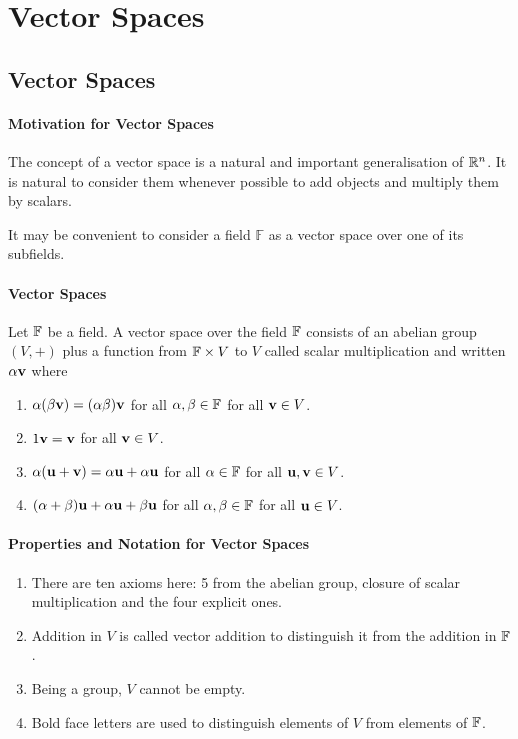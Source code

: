 \section{Vector Spaces}
\subsection{Vector Spaces}

\paragraph{Motivation for Vector Spaces}
The concept of a vector space is a natural and important generalisation of \(\mathbb{R}^n\). It is natural to consider them whenever possible to add objects and multiply them by scalars.

It may be convenient to consider a field \(\mathbb{F}\) as a vector
space over one of its subfields.

\paragraph{Vector Spaces}
Let \(\mathbb{F}\) be a field. A vector space over the field \(\mathbb{F}\) consists of an abelian group \((V, +)\) plus a function from \(\mathbb{F} \times V\) to \(V\) called scalar multiplication and written \(\alpha\mathbf{v}\) where
\begin{enumerate}
    \item \(\alpha(\beta\mathbf{v}) = (\alpha\beta)\mathbf{v}\) for all \(\alpha, \beta \in \mathbb{F}\) for all \(\mathbf{v} \in V\).
    \item \(1\mathbf{v} = \mathbf{v}\) for all \(\mathbf{v} \in V\).
    \item \(\alpha(\mathbf{u} + \mathbf{v}) = \alpha\mathbf{u} + \alpha\mathbf{u}\) for all \(\alpha \in \mathbb{F}\) for all \(\mathbf{u}, \mathbf{v} \in V\).
    \item \((\alpha + \beta)\mathbf{u} + \alpha\mathbf{u} + \beta\mathbf{u}\) for all \(\alpha, \beta \in \mathbb{F}\) for all \(\mathbf{u} \in V\).
\end{enumerate}

\paragraph{Properties and Notation for Vector Spaces}
\begin{enumerate}
    \item There are ten axioms here: 5 from the abelian group, closure of scalar multiplication and the four explicit ones.
    \item Addition in \(V\) is called vector addition to distinguish it from the addition in \(\mathbb{F}\).
    \item Being a group, \(V\) cannot be empty.
    \item Bold face letters are used to distinguish elements of \(V\) from elements of \(\mathbb{F}\).
\end{enumerate}

